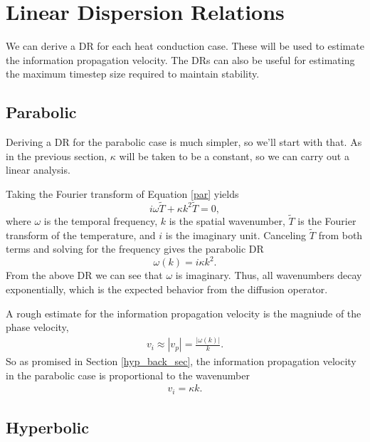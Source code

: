 \documentclass[iop]{emulateapj}
\begin{document}
	
	\section{Linear Dispersion Relations} \label{linear_sec}
	
			We can derive a \ac{DR} for each heat conduction case.
				These will be used to estimate the information propagation velocity.
				The \ac{DR}s can also be useful for estimating the maximum timestep size required to maintain stability.
				
		\subsection{Parabolic} \label{disp_par_sec}
		
			Deriving a \ac{DR} for the parabolic case is much simpler, so we'll start with that.
				As in the previous section, $\kappa$ will be taken to be a constant, so we can carry out a linear analysis.
				
			Taking the Fourier transform of Equation \ref{par} yields
			\begin{equation}
				i \omega \tilde{T} + \kappa k^2 \tilde{T} = 0,
			\end{equation}
			where $\omega$ is the temporal frequency, $k$ is the spatial wavenumber, $\tilde{T}$ is the Fourier transform of the temperature, and $i$ is the imaginary unit.
			Canceling $\tilde{T}$ from both terms and solving for the frequency gives the parabolic \ac{DR}
			\begin{equation}
				\omega(k) = i \kappa k^2.
			\end{equation}
			From the above \ac{DR} we can see that $\omega$ is imaginary. Thus, all wavenumbers decay exponentially, which is the expected behavior from the diffusion operator.
			
			A rough estimate for the information propagation velocity is the magniude of the phase velocity,
			\begin{align}
				v_i \approx |v_p| = \frac{|\omega(k)|}{k}.
			\end{align}
			So as promised in Section \ref{hyp_back_sec}, the information propagation velocity in the parabolic case is proportional to the wavenumber
			\begin{align}
				v_i = \kappa k.
			\end{align}
					
		\subsection{Hyperbolic} \label{disp_hyp_sec}
		
\end{document}
